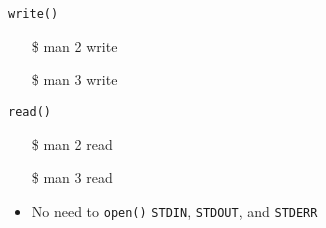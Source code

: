 \begin{frame}
  \begin{minipage}[t]{.53\linewidth}
    \begin{iblock}{\texttt{write()}}
      \begin{center}
      \end{center}
    \end{iblock}
    \ttfamily
    \begin{itemize}
    \item[\$] man 2 write
    \item[\$] man 3 write
    \end{itemize}
  \end{minipage}\qquad
  \begin{minipage}[t]{.37\linewidth}
    \begin{iblock}{\texttt{read()}}
      \begin{center}
      \end{center}
    \end{iblock}
    \ttfamily
    \begin{itemize}
    \item[\$] man 2 read
    \item[\$] man 3 read
    \end{itemize}
  \end{minipage}
  \vspace*{1em}
  \begin{itemize}
  \item No need to \texttt{open()} \texttt{STDIN}, \texttt{STDOUT}, and \texttt{STDERR}
  \end{itemize}
\end{frame}

\begin{frame}{}
  \begin{center}
    \begin{center}
    \end{center}
  \end{center}
\end{frame}

